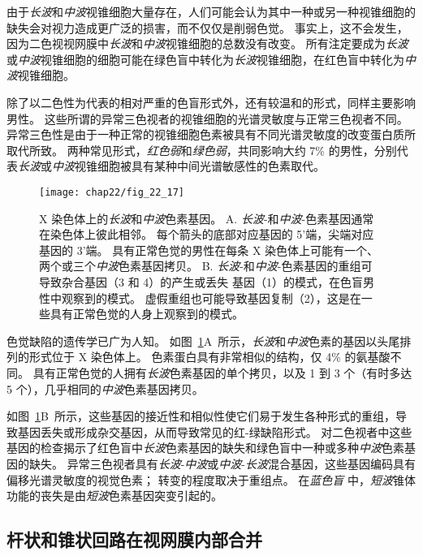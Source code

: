 由于\textit{长波}和\textit{中波}视锥细胞大量存在，人们可能会认为其中一种或另一种视锥细胞的缺失会对视力造成更广泛的损害，而不仅仅是削弱色觉。
事实上，这不会发生，因为二色视视网膜中\textit{长波}和\textit{中波}视锥细胞的总数没有改变。
所有注定要成为\textit{长波}或\textit{中波}视锥细胞的细胞可能在绿色盲中转化为\textit{长波}视锥细胞，在红色盲中转化为\textit{中波}视锥细胞。


除了以二色性为代表的相对严重的色盲形式外，还有较温和的形式，同样主要影响男性。
这些所谓的异常三色视者的视锥细胞的光谱灵敏度与正常三色视者不同。
异常三色性是由于一种正常的视锥细胞色素被具有不同光谱灵敏度的改变蛋白质所取代所致。
两种常见形式，\textit{红色弱}和\textit{绿色弱}，共同影响大约 7\% 的男性，分别代表\textit{长波}或\textit{中波}视锥细胞被具有某种中间光谱敏感性的色素取代。


\begin{figure}[htbp]
	\centering
	\texttt{[image: chap22/fig\_22\_17]}
	\caption{X 染色体上的\textit{长波}和\textit{中波}色素基因。 
		A. \textit{长波}-和\textit{中波}-色素基因通常在染色体上彼此相邻。
		每个箭头的底部对应基因的 5'端，尖端对应基因的 3'端。 
		具有正常色觉的男性在每条 X 染色体上可能有一个、两个或三个\textit{中波}色素基因拷贝\cite{nathans1986molecular}。
		B. \textit{长波}-和\textit{中波}-色素基因的重组可导致杂合基因（3 和 4）的产生或丢失 基因（1）的模式，在色盲男性中观察到的模式。 
		虚假重组也可能导致基因复制（2），这是在一些具有正常色觉的人身上观察到的模式。}
	\label{fig:22_17}
\end{figure}


色觉缺陷的遗传学已广为人知。
如图~\ref{fig:22_17}A~所示，\textit{长波}和\textit{中波}色素的基因以头尾排列的形式位于 X 染色体上。
色素蛋白具有非常相似的结构，仅 4\% 的氨基酸不同。 
具有正常色觉的人拥有\textit{长波}色素基因的单个拷贝，以及 1 到 3 个（有时多达 5 个），几乎相同的\textit{中波}色素基因拷贝。


如图~\ref{fig:22_17}B~所示，这些基因的接近性和相似性使它们易于发生各种形式的重组，导致基因丢失或形成杂交基因，从而导致常见的红-绿缺陷形式。
对二色视者中这些基因的检查揭示了红色盲中\textit{长波}色素基因的缺失和绿色盲中一种或多种\textit{中波}色素基因的缺失。
异常三色视者具有\textit{长波}-\textit{中波}或\textit{中波}-\textit{长波}混合基因，这些基因编码具有偏移光谱灵敏度的视觉色素；
转变的程度取决于重组点。
在\textit{蓝色盲} 中，\textit{短波}锥体功能的丧失是由\textit{短波}色素基因突变引起的。



\subsection{杆状和锥状回路在视网膜内部合并}

